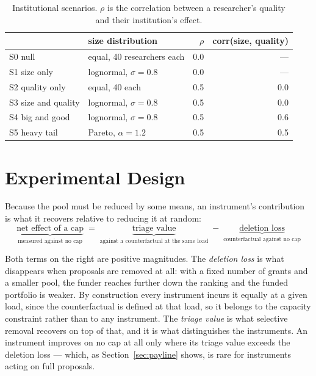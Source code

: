 \documentclass[11pt,a4paper]{article}
\begin{document}
\begin{table}[!htbp]
\centering
\small
\caption{Institutional scenarios. $\rho$ is the correlation between a
researcher's quality and their institution's effect.}
\label{tab:scen}
\begin{tabular}{llrr}
\toprule
 & size distribution & $\rho$ & corr(size, quality) \\
\midrule
S0 null              & equal, 40 researchers each & 0.0 & --- \\
S1 size only         & lognormal, $\sigma=0.8$    & 0.0 & --- \\
S2 quality only      & equal, 40 each             & 0.5 & 0.0 \\
S3 size and quality  & lognormal, $\sigma=0.8$    & 0.5 & 0.0 \\
S4 big and good      & lognormal, $\sigma=0.8$    & 0.5 & 0.6 \\
S5 heavy tail        & Pareto, $\alpha=1.2$       & 0.5 & 0.5 \\
\bottomrule
\end{tabular}
\end{table}

\section{Experimental Design}

Because the pool must be reduced by some means, an instrument's contribution is
what it recovers relative to reducing it at random:
\begin{equation}
\underbrace{\text{net effect of a cap}}_{\text{measured against no cap}}
\;=\;
\underbrace{\text{triage value}}_{\text{against a counterfactual at the same load}}
\;-\;
\underbrace{\text{deletion loss}}_{\text{counterfactual against no cap}}
\end{equation}

Both terms on the right are positive magnitudes. The \emph{deletion loss} is what
disappears when proposals are removed at all: with a fixed number of grants and a
smaller pool, the funder reaches further down the ranking and the funded portfolio
is weaker. By construction every instrument incurs it equally at a given load,
since the counterfactual is defined at that load, so it belongs to the capacity
constraint rather than to any instrument. The \emph{triage value} is what
selective removal recovers on top of that, and it is what distinguishes the
instruments. An instrument improves on no cap at all only where its triage value
exceeds the deletion loss --- which, as Section~\ref{sec:payline} shows, is rare for
instruments acting on full proposals.
\end{document}
